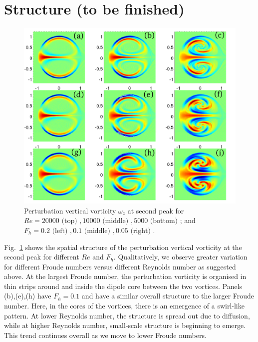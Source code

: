 \section{Structure (to be finished)} 
\begin{figure}
\begin{center}
\includegraphics[width=\textwidth]{vorticity_second_peak}
\caption{Perturbation vertical vorticity $\omega_{z}$ at second peak for $Re=20000\text{ (top) }, 10000 \text{ (middle) }, 5000 \text{ (bottom) }$; and $F_{h}=0.2 \text{ (left) }, 0.1 \text{ (middle) }, 0.05 \text{ (right) }$.}
\label{secondpeak}
\end{center}
\end{figure}
Fig.~\ref{secondpeak} shows the spatial structure of the perturbation vertical vorticity at the second peak for different $Re$ and $F_{h}$. Qualitatively, we observe greater variation for different Froude numbers versus different Reynolds number as suggested above.  At the largest Froude number, the perturbation vorticity is organised in thin strips around and inside the dipole core between the two vortices. Panels (b),(e),(h) have $F_{h}=0.1$ and have a similar overall structure to the larger Froude number. Here, in the cores of the vortices, there is an emergence of a swirl-like pattern. At lower Reynolds number, the structure is spread out due to diffusion, while at higher Reynolds number, small-scale structure is beginning to emerge. This trend continues overall as we move to lower Froude numbers. 

